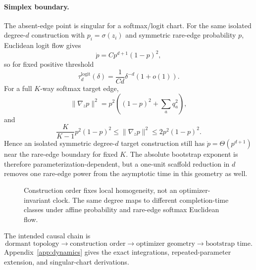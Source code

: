 \paragraph{Simplex boundary.}
The absent-edge point is singular for a softmax/logit chart. For the same isolated degree-$d$ construction with $p_i=\sigma(z_i)$ and symmetric rare-edge probability $p$, Euclidean logit flow gives
\[
\dot p=Cp^{d+1}(1-p)^2,
\]
so for fixed positive threshold
\[
\boxed{\tau_d^{\mathrm{logit}}(\delta)=\frac{1}{Cd}\delta^{-d}(1+o(1)).}
\]
For a full $K$-way softmax target edge,
\[
\|\nabla_z p\|^2=p^2\left((1-p)^2+\sum_aq_a^2\right),
\]
and
\[
\frac{K}{K-1}p^2(1-p)^2\leq\|\nabla_zp\|^2\leq2p^2(1-p)^2.
\]
Hence an isolated symmetric degree-$d$ target construction still has $\dot p=\Theta(p^{d+1})$ near the rare-edge boundary for fixed $K$. The absolute bootstrap exponent is therefore parameterization-dependent, but a one-unit scaffold reduction in $d$ removes one rare-edge power from the asymptotic time in this geometry as well.

\begin{figure}[t]
\centering
{}
\caption{Construction order fixes local homogeneity, not an optimizer-invariant clock. The same degree maps to different completion-time classes under affine probability and rare-edge softmax Euclidean flow.}
\label{fig:geometry}
\end{figure}

The intended causal chain is
\[
\boxed{\text{dormant topology}\to\text{construction order}\to\text{optimizer geometry}\to\text{bootstrap time}.}
\]
Appendix~\ref{app:dynamics} gives the exact integrations, repeated-parameter extension, and singular-chart derivations.
